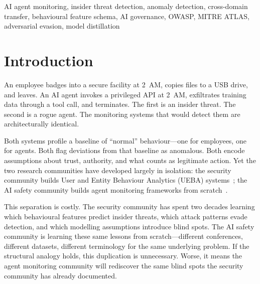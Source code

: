 \documentclass[conference]{IEEEtran}
\begin{document}
\begin{abstract}
with attack intensity for FOCUSED/BROAD/COT profiles, while HYDRA remains near-chance regardless of scale. Adversarial evasion testing reveals that mimicry attacks degrade detection by up to 25\%, with Memory \& Context Poisoning (ASI06) most vulnerable. Temporal window ablation finds that 10 spans are optimal for Isolation Forest on both TRAIL and ATBench. Mapping five MITRE ATLAS techniques~\cite{mitre2024atlas} into the UBFS confirms that the framework generalises beyond OWASP: all five techniques are strongly detectable ($>$0.93 AUC-ROC for IF/LSTM), introducing no new blind spots. The detection models port across domains. So do their biases, and so do their blind spots.
\end{abstract}

\begin{IEEEkeywords}
AI agent monitoring, insider threat detection, anomaly detection, cross-domain transfer, behavioural feature schema, AI governance, OWASP, MITRE ATLAS, adversarial evasion, model distillation
\end{IEEEkeywords}

\section{Introduction}
\label{sec:introduction}

An employee badges into a secure facility at 2~AM, copies files to a USB drive, and leaves. An AI agent invokes a privileged API at 2~AM, exfiltrates training data through a tool call, and terminates. The first is an insider threat. The second is a rogue agent. The monitoring systems that would detect them are architecturally identical.

Both systems profile a baseline of ``normal'' behaviour---one for employees, one for agents. Both flag deviations from that baseline as anomalous. Both encode assumptions about trust, authority, and what counts as legitimate action. Yet the two research communities have developed largely in isolation: the security community builds User and Entity Behaviour Analytics (UEBA) systems~\cite{homoliak2019insight}; the AI safety community builds agent monitoring frameworks from scratch~\cite{owasp2024asi}.

This separation is costly. The security community has spent two decades learning which behavioural features predict insider threats, which attack patterns evade detection, and which modelling assumptions introduce blind spots. The AI safety community is learning these same lessons from scratch---different conferences, different datasets, different terminology for the same underlying problem. If the structural analogy holds, this duplication is unnecessary. Worse, it means the agent monitoring community will rediscover the same blind spots the security community has already documented.
\end{document}
